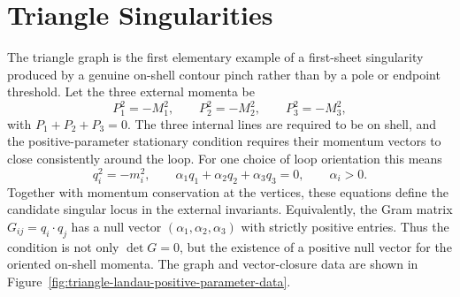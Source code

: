 \section{Triangle Singularities}

The triangle graph is the first elementary example of a first-sheet singularity
produced by a genuine on-shell contour pinch rather than by a pole or endpoint
threshold. Let the three external momenta be
\[
  P_1^2=-M_1^2,\qquad
  P_2^2=-M_2^2,\qquad
  P_3^2=-M_3^2 ,
\]
with \(P_1+P_2+P_3=0\). The three internal lines are required to be on shell,
and the positive-parameter stationary condition requires their momentum
vectors to close consistently around the loop.
For one choice of loop orientation this means
\[
  q_i^2=-m_i^2,\qquad
  \alpha_1q_1+\alpha_2q_2+\alpha_3q_3=0,
  \qquad
  \alpha_i>0 .
\]
Together with momentum conservation at the vertices, these equations define
the candidate singular locus in the external invariants.  Equivalently, the
Gram matrix \(G_{ij}=q_i\cdot q_j\) has a null vector
\((\alpha_1,\alpha_2,\alpha_3)\) with strictly positive entries.  Thus the
condition is not only \(\det G=0\), but the existence of a positive null vector
for the oriented on-shell momenta.  The graph and vector-closure data are shown
in Figure~\ref{fig:triangle-landau-positive-parameter-data}.


